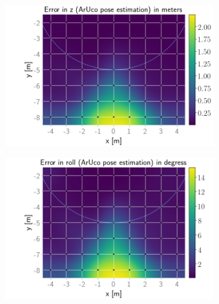 \documentclass[../Head/report.tex]{subfiles}
\begin{document}
\begin{figure}[H]
    \hspace{-0.9em}
    \begin{subfigure}[t]{.337\textwidth}
        \centering
        \includegraphics[width=\textwidth]{../Figures/GPS2Vision_pose_estimation_test/test1_aruco_board_width_0.2_space_0.1/aruco_pose_estimation_error_z.png}
        \caption{}
        \label{fig:GPS2Vision_pose_estimation_test1_error_z}
    \end{subfigure}
        \begin{subfigure}[t]{.337\textwidth}
        \centering
        \includegraphics[width=\textwidth]{../Figures/GPS2Vision_pose_estimation_test/test1_aruco_board_width_0.2_space_0.1/aruco_pose_estimation_error_roll.png}
        \caption{}
        \label{fig:GPS2Vision_pose_estimation_test1_error_roll}
    \end{subfigure}
    \hspace{-0.9em}

\end{figure}
\end{document}
